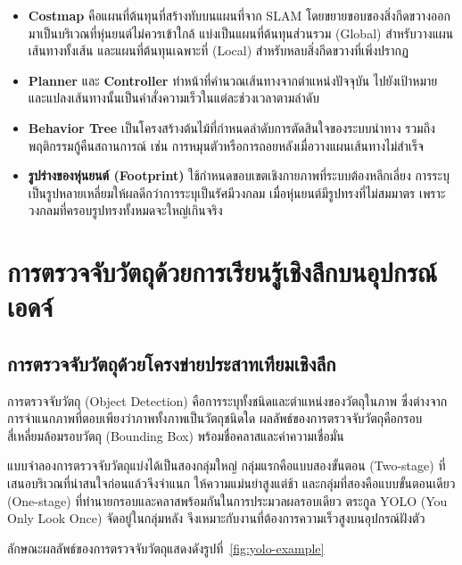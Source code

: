 \documentclass[a4paper,12pt]{report}
\begin{document}
\begin{itemize}[leftmargin=1.25cm, itemsep=4pt, topsep=6pt]
    \item \textbf{Costmap} คือแผนที่ต้นทุนที่สร้างทับบนแผนที่จาก SLAM
    โดยขยายขอบของสิ่งกีดขวางออกมาเป็นบริเวณที่หุ่นยนต์ไม่ควรเข้าใกล้
    แบ่งเป็นแผนที่ต้นทุนส่วนรวม (Global) สำหรับวางแผนเส้นทางทั้งเส้น
    และแผนที่ต้นทุนเฉพาะที่ (Local) สำหรับหลบสิ่งกีดขวางที่เพิ่งปรากฏ

    \item \textbf{Planner} และ \textbf{Controller} ทำหน้าที่คำนวณเส้นทางจากตำแหน่งปัจจุบัน
    ไปยังเป้าหมาย และแปลงเส้นทางนั้นเป็นคำสั่งความเร็วในแต่ละช่วงเวลาตามลำดับ

    \item \textbf{Behavior Tree} เป็นโครงสร้างต้นไม้ที่กำหนดลำดับการตัดสินใจของระบบนำทาง
    รวมถึงพฤติกรรมกู้คืนสถานการณ์ เช่น การหมุนตัวหรือการถอยหลังเมื่อวางแผนเส้นทางไม่สำเร็จ

    \item \textbf{รูปร่างของหุ่นยนต์ (Footprint)} ใช้กำหนดขอบเขตเชิงกายภาพที่ระบบต้องหลีกเลี่ยง
    การระบุเป็นรูปหลายเหลี่ยมให้ผลดีกว่าการระบุเป็นรัศมีวงกลม
    เมื่อหุ่นยนต์มีรูปทรงที่ไม่สมมาตร เพราะวงกลมที่ครอบรูปทรงทั้งหมดจะใหญ่เกินจริง
\end{itemize}


\section{การตรวจจับวัตถุด้วยการเรียนรู้เชิงลึกบนอุปกรณ์เอดจ์}

\subsection{การตรวจจับวัตถุด้วยโครงข่ายประสาทเทียมเชิงลึก}

การตรวจจับวัตถุ (Object Detection) คือการระบุทั้งชนิดและตำแหน่งของวัตถุในภาพ
ซึ่งต่างจากการจำแนกภาพที่ตอบเพียงว่าภาพทั้งภาพเป็นวัตถุชนิดใด
ผลลัพธ์ของการตรวจจับวัตถุคือกรอบสี่เหลี่ยมล้อมรอบวัตถุ (Bounding Box)
พร้อมชื่อคลาสและค่าความเชื่อมั่น

แบบจำลองการตรวจจับวัตถุแบ่งได้เป็นสองกลุ่มใหญ่
กลุ่มแรกคือแบบสองขั้นตอน (Two-stage) ที่เสนอบริเวณที่น่าสนใจก่อนแล้วจึงจำแนก
ให้ความแม่นยำสูงแต่ช้า และกลุ่มที่สองคือแบบขั้นตอนเดียว (One-stage)
ที่ทำนายกรอบและคลาสพร้อมกันในการประมวลผลรอบเดียว
ตระกูล YOLO (You Only Look Once) จัดอยู่ในกลุ่มหลัง
จึงเหมาะกับงานที่ต้องการความเร็วสูงบนอุปกรณ์ฝังตัว

ลักษณะผลลัพธ์ของการตรวจจับวัตถุแสดงดังรูปที่~\ref{fig:yolo-example}
\end{document}
